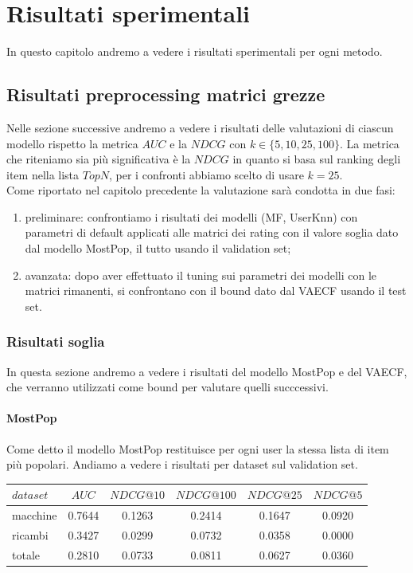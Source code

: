 \hypertarget{(chap:capitolo6)}{}
\chapter{Risultati sperimentali}
In questo capitolo andremo a vedere i risultati sperimentali per ogni metodo.
\section{Risultati preprocessing matrici grezze}
Nelle sezione successive andremo a vedere i risultati delle valutazioni di ciascun modello rispetto la metrica $AUC$ e la $NDCG$ con $k\in \{5, 10, 25, 100\}$.
La metrica che riteniamo sia più significativa è la $NDCG$ in quanto si basa sul ranking degli item nella lista $TopN$, per i confronti abbiamo scelto di usare $k=25$.\\
Come riportato nel capitolo precedente la valutazione sarà condotta in due fasi: 
\begin{enumerate}
    \item preliminare: confrontiamo i risultati dei modelli (MF, UserKnn) con parametri di default applicati alle matrici dei rating con il valore soglia dato dal modello MostPop, il tutto usando il validation set;
    \item avanzata: dopo aver effettuato il tuning sui parametri dei modelli con le matrici rimanenti, si confrontano con il bound dato dal VAECF usando il test set.
\end{enumerate} 

\subsection{Risultati soglia}
In questa sezione andremo a vedere i risultati del modello MostPop e del VAECF, che verranno utilizzati come bound per valutare quelli succcessivi. 

\subsubsection{MostPop}
Come detto il modello MostPop restituisce per ogni user la stessa lista di item più popolari.
Andiamo a vedere i risultati per dataset sul validation set.\\

\begin{tabular}{|l|c|cccc|}
    \toprule
    $dataset$ &    $AUC$ &  $NDCG@10$ & $NDCG@100$  & $NDCG@25$ & $NDCG@5$  \\
    \midrule
    macchine & 0.7644 & 0.1263 &   0.2414 &  0.1647 & 0.0920 \\
    ricambi  & 0.3427 &  0.0299 &   0.0732 &  0.0358 & 0.0000 \\
    totale  & 0.2810 &  0.0733 &   0.0811 &  0.0627 & 0.0360 \\

\bottomrule
\end{tabular}\\

